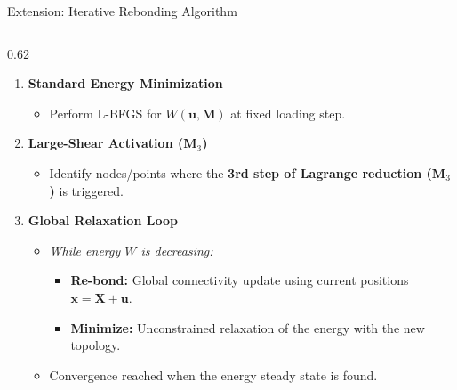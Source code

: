 \documentclass[10pt, aspectratio=169]{beamer}
\begin{document}
\begin{frame}{Extension: Iterative Rebonding Algorithm}
    \begin{columns}[c, onlytextwidth]
        \begin{column}{0.62\textwidth}
            \begin{enumerate}
                \item \textbf{\color{AcademicNavy} Standard Energy Minimization}
                \begin{itemize}
                    \item Perform L-BFGS for $W(\mathbf{u}, \mathbf{M})$ at fixed loading step.
                \end{itemize}
                
                \item \textbf{\color{AcademicNavy} Large-Shear Activation ($\mathbf{M}_3$)}
                \begin{itemize}
                    \item Identify nodes/points where the \textbf{3rd step of Lagrange reduction ($\mathbf{M}_3$)} is triggered.
                \end{itemize}
                
                \item \textbf{\color{AcademicNavy} Global Relaxation Loop}
                \begin{itemize}
                    \item \textit{While energy $W$ is decreasing:}
                    \begin{itemize}
                        \item \textbf{Re-bond:} Global connectivity update using current positions $\mathbf{x} = \mathbf{X} + \mathbf{u}$.
                        \item \textbf{Minimize:} Unconstrained relaxation of the energy with the new topology.
                    \end{itemize}
                    \item Convergence reached when the energy steady state is found.
                \end{itemize}
            \end{enumerate}
        \end{column}
        

\end{columns}
\end{frame}
\end{document}
